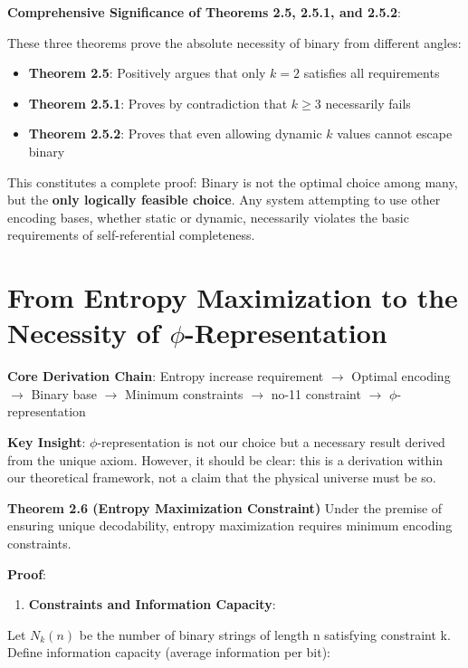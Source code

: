\textbf{Comprehensive Significance of Theorems 2.5, 2.5.1, and 2.5.2}:

These three theorems prove the absolute necessity of binary from different angles:
\begin{itemize}
\item \textbf{Theorem 2.5}: Positively argues that only $k=2$ satisfies all requirements
\item \textbf{Theorem 2.5.1}: Proves by contradiction that $k \geq 3$ necessarily fails
\item \textbf{Theorem 2.5.2}: Proves that even allowing dynamic $k$ values cannot escape binary
\end{itemize}

This constitutes a complete proof: Binary is not the optimal choice among many, but the \textbf{only logically feasible choice}. Any system attempting to use other encoding bases, whether static or dynamic, necessarily violates the basic requirements of self-referential completeness.

\section{From Entropy Maximization to the Necessity of $\phi$-Representation}
\label{sec:ch02_encoding:from-entropy-maximization-to-the-necessity-of-phi-representation}

\textbf{Core Derivation Chain}:
Entropy increase requirement $\rightarrow$ Optimal encoding $\rightarrow$ Binary base $\rightarrow$ Minimum constraints $\rightarrow$ no-11 constraint $\rightarrow$ $\phi$-representation

\textbf{Key Insight}: $\phi$-representation is not our choice but a necessary result derived from the unique axiom. However, it should be clear: this is a derivation within our theoretical framework, not a claim that the physical universe must be so.

\textbf{Theorem 2.6 (Entropy Maximization Constraint)}
\label{thm:2.6}
Under the premise of ensuring unique decodability, entropy maximization requires minimum encoding constraints.

\textbf{Proof}:

\begin{enumerate}
\item \textbf{Constraints and Information Capacity}:
\end{enumerate}
   Let $N_k(n)$ be the number of binary strings of length n satisfying constraint k.
   Define information capacity (average information per bit):
   
